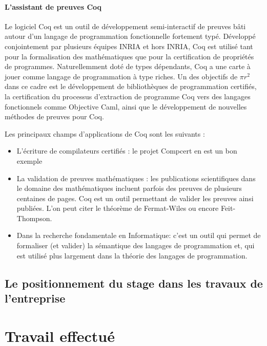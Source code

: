 \documentclass[a4paper, 11pt]{report}
\newcommand{\pir}[0]{\textbf{$\pi r^2$}\xspace}
\begin{document}
      \subsubsection{L'assistant de preuves Coq}
      Le logiciel Coq est un outil de développement semi-interactif de
      preuves bâti autour d'un langage de programmation fonctionnelle
      fortement typé. Développé conjointement par plusieurs équipes INRIA et
      hors INRIA, Coq est utilisé tant pour la formalisation des
      mathématiques que pour la certification de propriétés de programmes.
      Naturellemment doté de types dépendants, Coq a une carte à jouer comme
      langage de programmation à type riches. Un des objectifs de \pir dans
      ce cadre est le développement de bibliothèques de programmation
      certifiés, la certification du processus d'extraction de programme Coq
      vers des langages fonctionnels comme Objective Caml, ainsi que le
      développement de nouvelles méthodes de preuves pour Coq.

      Les principaux champs d'applications de Coq sont les suivants :
      \begin{itemize}
        \item L'écriture de compilateurs certifiés : le projet Compcert en
          est un bon exemple
        \item La validation de preuves mathématiques : les publications
          scientifiques dans le domaine des mathématiques incluent parfois
          des preuves de plusieurs centaines de pages. Coq est un outil
          permettant de valider les preuves ainsi publiées. L'on peut citer
          le théorème de Fermat-Wiles ou encore Feit-Thompson.
        \item Dans la recherche fondamentale en Informatique: c'est un outil
          qui permet de formaliser (et valider) la sémantique des langages de
          programmation et, qui est utilisé plus largement dans la théorie
          des langages de programmation.
      \end{itemize}

      \section{Le positionnement du stage dans les travaux de l'entreprise}

\chapter{Travail effectué}
\end{document}

